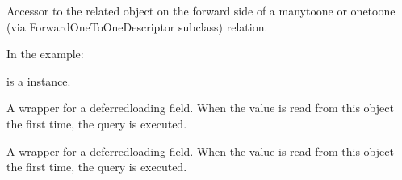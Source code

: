 \documentclass[letterpaper,10pt,spanish]{sphinxmanual}
\begin{document}
\begin{fulllineitems}
\begin{fulllineitems}
\pysigstartsignatures
{}
\pysigstopsignatures
\end{fulllineitems}



\begin{fulllineitems}

\pysigstartsignatures
{}
\pysigstopsignatures
\sphinxAtStartPar
Accessor to the related object on the forward side of a many\sphinxhyphen{}to\sphinxhyphen{}one or
one\sphinxhyphen{}to\sphinxhyphen{}one (via ForwardOneToOneDescriptor subclass) relation.

\sphinxAtStartPar
In the example:

\begin{sphinxVerbatim}[commandchars=\\\{\}]
 
       
\end{sphinxVerbatim}

\sphinxAtStartPar
{} is a  instance.

\end{fulllineitems}



\begin{fulllineitems}

\pysigstartsignatures
{}
\pysigstopsignatures
\end{fulllineitems}



\begin{fulllineitems}

\pysigstartsignatures
{}
\pysigstopsignatures
\sphinxAtStartPar
A wrapper for a deferred\sphinxhyphen{}loading field. When the value is read from this
object the first time, the query is executed.

\end{fulllineitems}



\begin{fulllineitems}

\pysigstartsignatures
{}
\pysigstopsignatures
\sphinxAtStartPar
A wrapper for a deferred\sphinxhyphen{}loading field. When the value is read from this
object the first time, the query is executed.


\end{fulllineitems}
\end{fulllineitems}
\end{document}
